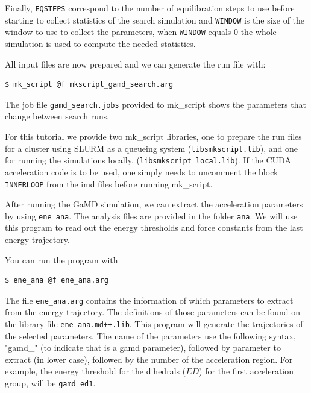 Finally, \texttt{EQSTEPS}  correspond to the number of equilibration steps to use before starting to collect statistics of the search simulation and \texttt{WINDOW} is the size of the window to use to collect the parameters, when \texttt{WINDOW} equals 0 the whole simulation is used to compute the needed statistics.

All input files are now prepared and we can generate the run file with:
\begin{lstlisting}
$ mk_script @f mkscript_gamd_search.arg
\end{lstlisting}
The job file \texttt{gamd\_search.jobs} provided to mk\_script shows the parameters that change between search runs.

For this tutorial we provide two mk\_script libraries, one to prepare the run files for a cluster using SLURM as a queueing system (\texttt{libs\/mkscript.lib}), and one for running the simulations locally, (\texttt{libs\/mkscript\_local.lib}). If the CUDA acceleration code is to be used, one simply needs to uncomment the block \texttt{INNERLOOP} from the imd files before running mk\_script.

After running the GaMD simulation, we can extract the acceleration parameters by using \texttt{ene\_ana}. The analysis files are provided in the folder \texttt{ana}.
We will use this program to read out the energy thresholds and force constants from the last energy trajectory.

You can run the program with 
\begin{lstlisting}
$ ene_ana @f ene_ana.arg
\end{lstlisting}

The file \texttt{ene\_ana.arg} contains the information of which parameters to extract from the energy trajectory. The definitions of those parameters can be found on the library file \texttt{ene\_ana.md++.lib}. This program will generate the trajectories of the selected parameters. The name of the parameters use the following syntax, "gamd\_" (to indicate that is a gamd parameter), followed by parameter to extract (in lower case), followed by the number of the acceleration region. For example, the energy threshold for the dihedrals ($ED$) for the first acceleration group, will be \texttt{gamd\_ed1}.


